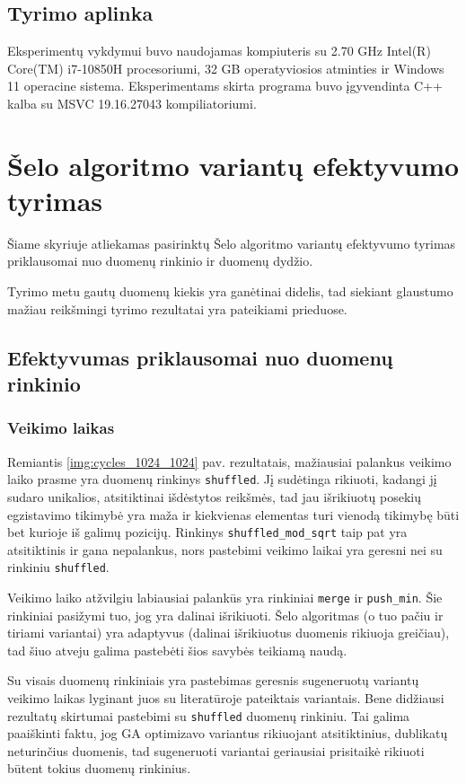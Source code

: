 \documentclass{VUMIFInfBakalaurinis}
\begin{document}
\subsection{Tyrimo aplinka}

Eksperimentų vykdymui buvo naudojamas kompiuteris su 2.70 GHz Intel(R) Core(TM) i7-10850H procesoriumi,
32 GB operatyviosios atminties ir Windows 11 operacine sistema.
Eksperimentams skirta programa buvo įgyvendinta C++ kalba su MSVC 19.16.27043 kompiliatoriumi.

\section{Šelo algoritmo variantų efektyvumo tyrimas}

Šiame skyriuje atliekamas pasirinktų Šelo algoritmo variantų efektyvumo tyrimas priklausomai nuo duomenų rinkinio ir duomenų dydžio.

Tyrimo metu gautų duomenų kiekis yra ganėtinai didelis, tad
siekiant glaustumo mažiau reikšmingi tyrimo rezultatai yra pateikiami prieduose.

\subsection{Efektyvumas priklausomai nuo duomenų rinkinio}

\subsubsection{Veikimo laikas}

Remiantis \ref{img:cycles_1024_1024} pav. rezultatais, mažiausiai palankus veikimo laiko prasme yra duomenų rinkinys \verb|shuffled|.
Jį sudėtinga rikiuoti, kadangi jį sudaro unikalios, atsitiktinai išdėstytos reikšmės, tad jau išrikiuotų posekių egzistavimo tikimybė yra maža ir
kiekvienas elementas turi vienodą tikimybę būti bet kurioje iš galimų pozicijų.
Rinkinys \verb|shuffled_mod_sqrt| taip pat yra atsitiktinis ir gana nepalankus, nors 
pastebimi veikimo laikai yra geresni nei su rinkiniu \verb|shuffled|.

Veikimo laiko atžvilgiu labiausiai palankūs yra rinkiniai \verb|merge| ir \verb|push_min|.
Šie rinkiniai pasižymi tuo, jog yra dalinai išrikiuoti.
Šelo algoritmas (o tuo pačiu ir tiriami variantai) yra adaptyvus (dalinai išrikiuotus duomenis rikiuoja greičiau),
tad šiuo atveju galima pastebėti šios savybės teikiamą naudą.

Su visais duomenų rinkiniais yra pastebimas geresnis sugeneruotų variantų veikimo laikas lyginant juos su literatūroje pateiktais variantais. 
Bene didžiausi rezultatų skirtumai pastebimi su \verb|shuffled| duomenų rinkiniu.
Tai galima paaiškinti faktu, jog GA optimizavo variantus rikiuojant atsitiktinius, dublikatų neturinčius duomenis, tad sugeneruoti variantai
geriausiai prisitaikė rikiuoti būtent tokius duomenų rinkinius.
\end{document}
